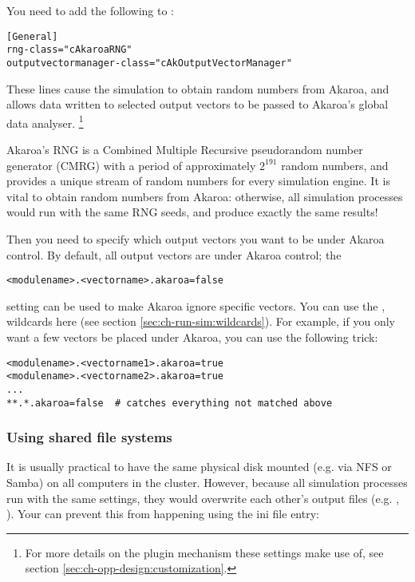 You need to add the following to :

\begin{verbatim}
[General]
rng-class="cAkaroaRNG"
outputvectormanager-class="cAkOutputVectorManager"
\end{verbatim}

These lines cause the simulation to obtain random numbers from Akaroa,
and allows data written to selected output vectors to be passed to Akaroa's
global data analyser.
    \footnote{For more details on the plugin mechanism these settings make use of,
    see section \ref{sec:ch-opp-design:customization}.}

Akaroa's RNG is a Combined Multiple Recursive pseudorandom
number generator (CMRG) with a period of approximately $2^{191}$
random numbers, and provides a unique stream of random numbers
for every simulation engine. It is vital to obtain random numbers
from Akaroa: otherwise, all simulation processes would run with the same
RNG seeds, and produce exactly the same results!

Then you need to specify which output vectors you want to
be under Akaroa control. By default, all output vectors are under Akaroa
control; the

\begin{verbatim}
<modulename>.<vectorname>.akaroa=false
\end{verbatim}

setting can be used to make Akaroa ignore specific vectors.
You can use the \ttt{*}, \ttt{**} wildcards here (see
section \ref{sec:ch-run-sim:wildcards}). For example,
if you only want a few vectors be placed under Akaroa,
you can use the following trick:

\begin{verbatim}
<modulename>.<vectorname1>.akaroa=true
<modulename>.<vectorname2>.akaroa=true
...
**.*.akaroa=false  # catches everything not matched above
\end{verbatim}


\subsubsection{Using shared file systems}
\label{sec:run-sim:using-shared-filesystems}

It is usually practical to have the same physical disk mounted (e.g. via NFS or Samba)
on all computers in the cluster. However, because all {\opp} simulation
processes run with the same settings, they would overwrite each other's
output files (e.g. , ).
Your can prevent this from happening using the
 ini file entry:


